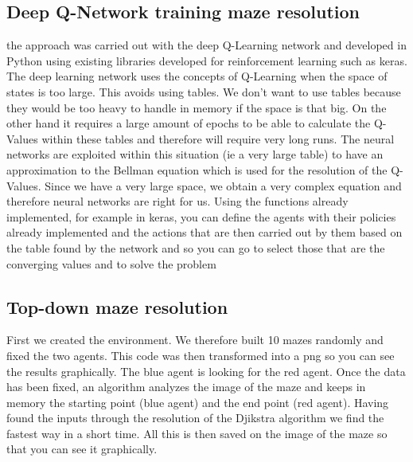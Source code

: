 \subsection{Deep Q-Network training maze resolution}
the approach was carried out with the deep Q-Learning network and developed in Python using existing libraries developed for reinforcement learning such as keras.
The deep learning network uses the concepts of Q-Learning when the space of states is too large. This avoids using tables. We don't want to use tables because they would be too heavy to handle in memory if the space is that big. On the other hand it requires a large amount of epochs to be able to calculate the Q-Values within these tables and therefore will require very long runs. The neural networks are exploited within this situation (ie a very large table) to have an approximation to the Bellman equation which is used for the resolution of the Q-Values. Since we have a very large space, we obtain a very complex equation and therefore neural networks are right for us. Using the functions already implemented, for example in keras, you can define the agents with their policies already implemented and the actions that are then carried out by them based on the table found by the network and so you can go to select those that are the converging values and to solve the problem

\subsection{Top-down maze resolution }
First we created the environment. We therefore built 10 mazes randomly and fixed the two agents. This code was then transformed into a png so you can see the results graphically.
The blue agent is looking for the red agent.
Once the data has been fixed, an algorithm analyzes the image of the maze and keeps in memory the starting point (blue agent) and the end point (red agent).
Having found the inputs through the resolution of the Djikstra algorithm we find the fastest way in a short time.
All this is then saved on the image of the maze so that you can see it graphically.
